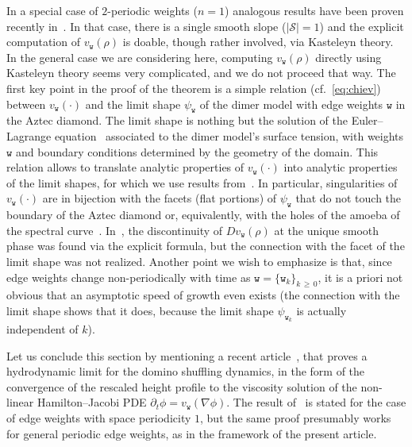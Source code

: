 \documentclass[AHL,Unicode,longabstracts,published]{cedram}
\newcommand{\ttw}{\mathtt{w}}
\newcommand{\clS}{\mathcal{S}}
\newcommand{\ttw}{\mathtt{w}}
\begin{document}
In a special case of $2$-periodic weights ($n=1$) analogous results have been proven recently in~\cite{CT:18}. In that case, there is a single smooth slope ($|\clS|=1$) and the explicit computation of $v_{\ttw}(\rho)$ is doable, though rather involved, via Kasteleyn theory. In the general case we are considering here, computing $v_{\ttw}(\rho)$ directly using Kasteleyn theory seems very complicated, and we do not proceed that way. The first key point in the proof of the theorem is a simple relation (cf.~\eqref{eq:chiev}) between $v_{\ttw}(\cdot)$ and the limit shape $\psi_{\ttw}$ of the dimer model with edge weights $\ttw$ in the Aztec diamond. The limit shape is nothing but the solution of the Euler--Lagrange equation~\cite{KO07} associated to the dimer model's surface tension, with weights $\ttw$ and boundary conditions determined by the geometry of the domain. This relation allows to translate analytic properties of $v_{\ttw}(\cdot)$ into analytic properties of the limit shapes, for which we use results from~\cite{Duse,SS10}. In particular, singularities of $v_{\ttw}(\cdot)$ are in bijection with the facets (flat portions) of $\psi_{\ttw}$ that do not touch the boundary of the Aztec diamond or, equivalently, with the holes of the amoeba of the spectral curve~\cite{Kenyon2003}. In~\cite{CT:18}, the discontinuity of $Dv_{\ttw}(\rho)$ at the unique smooth phase was found via the explicit formula, but the connection with the facet of the limit shape was not realized. Another point we wish to emphasize is that, since edge weights change non-periodically with time as $\ttw=\{\ttw_k\}_{k\,\ge\,0}$, it is a priori not obvious that an asymptotic speed of growth even exists (the connection with the limit shape shows that it does, because the limit shape $\psi_{\ttw_k}$ is actually independent of $k$).


Let us conclude this section by mentioning a recent article~\cite{zhang2018domino}, that proves a hydrodynamic limit for the domino shuffling dynamics, in the form of the convergence of the rescaled height profile to the viscosity solution of the non-linear Hamilton--Jacobi PDE $\partial_t \phi=v_{\ttw}(\nabla\phi)$. The result of~\cite{zhang2018domino} is stated for the case of edge weights with space periodicity $1$, but the same proof presumably works for general periodic edge weights, as in the framework of the present article.
\end{document}
